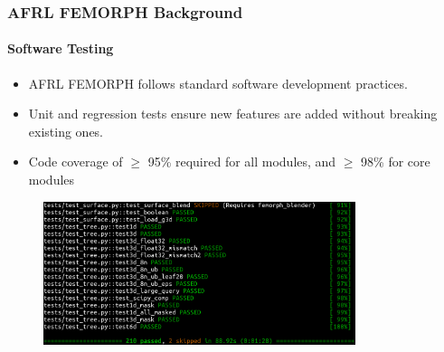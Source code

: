 \documentclass[t]{beamer}
\begin{document}
\begin{frame}
  \frametitle{AFRL FEMORPH Background}
  \framesubtitle{Software Testing}

  \begin{itemize}
  \item AFRL FEMORPH follows standard software development practices.
  \item Unit and regression tests ensure new features are added without breaking existing ones.
  \item Code coverage of $\geq$ 95\% required for all modules, and $\geq$ 98\% for core modules
  \end{itemize}

      \begin{figure}
       \includegraphics[height=1.65in]{./figures/pytest.png}
      \end{figure}

\end{frame}


\end{document}

